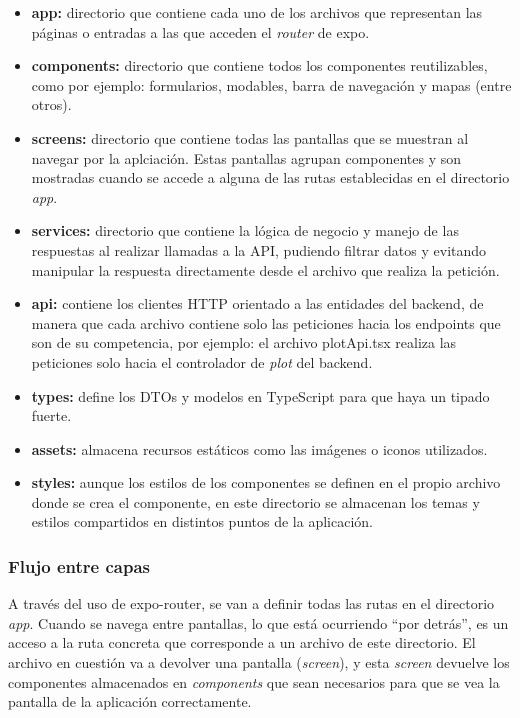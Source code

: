 \begin{itemize}
    \item \textbf{app:} directorio que contiene cada uno de los archivos que representan las páginas o entradas a las que acceden el \textit{router} de expo. 
     
    \item \textbf{components:} directorio que contiene todos los componentes reutilizables, como por ejemplo: formularios, modables, barra de navegación y mapas (entre otros).
     
    \item \textbf{screens:} directorio que contiene todas las pantallas que se muestran al navegar por la aplciación. Estas pantallas agrupan componentes y son mostradas cuando se 
    accede a alguna de las rutas establecidas en el directorio \textit{app}.

    \item \textbf{services:} directorio que contiene la lógica de negocio y manejo de las respuestas al realizar llamadas a la API, pudiendo filtrar datos y evitando manipular la respuesta
    directamente desde el archivo que realiza la petición.

    \item \textbf{api:} contiene los clientes HTTP orientado a las entidades del backend, de manera que cada archivo contiene solo las peticiones hacia los endpoints que son de su competencia,
    por ejemplo: el archivo plotApi.tsx realiza las peticiones solo hacia el controlador de \textit{plot} del backend.

    \item \textbf{types:} define los DTOs y modelos en TypeScript para que haya un tipado fuerte.
    
    \item \textbf{assets:} almacena recursos estáticos como las imágenes o iconos utilizados.
    
    \item \textbf{styles:} aunque los estilos de los componentes se definen en el propio archivo donde se crea el componente, en este directorio se almacenan los temas y estilos compartidos
    en distintos puntos de la aplicación.
\end{itemize}

\subsubsection{Flujo entre capas}

A través del uso de expo-router, se van a definir todas las rutas en el directorio \textit{app}. Cuando se navega entre pantallas, lo que está ocurriendo ``por detrás'', es un acceso a la ruta concreta
que corresponde a un archivo de este directorio. El archivo en cuestión va a devolver una pantalla (\textit{screen}), y esta \textit{screen} devuelve los componentes almacenados en \textit{components} que sean 
necesarios para que se vea la pantalla de la aplicación correctamente.


